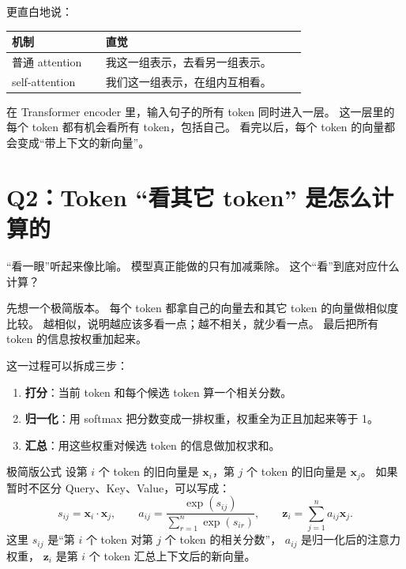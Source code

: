 \documentclass[11pt,a4paper]{ctexart}
\newcommand{\vect}[1]{\boldsymbol{#1}}
\begin{document}
更直白地说：

\begin{center}
\begin{tabular}{>{\raggedright\arraybackslash}p{0.28\linewidth} >{\raggedright\arraybackslash}p{0.60\linewidth}}
\toprule
机制 & 直觉 \\
\midrule
普通 attention & 我这一组表示，去看另一组表示。\\
self-attention & 我们这一组表示，在组内互相看。\\
\bottomrule
\end{tabular}
\end{center}

在 Transformer encoder 里，输入句子的所有 token 同时进入一层。
这一层里的每个 token 都有机会看所有 token，包括自己。
看完以后，每个 token 的向量都会变成“带上下文的新向量”。

\section{Q2：Token “看其它 token” 是怎么计算的}

\begin{questionblock}
“看一眼”听起来像比喻。
模型真正能做的只有加减乘除。
这个“看”到底对应什么计算？
\end{questionblock}

\begin{intuitionblock}
先想一个极简版本。
每个 token 都拿自己的向量去和其它 token 的向量做相似度比较。
越相似，说明越应该多看一点；越不相关，就少看一点。
最后把所有 token 的信息按权重加起来。
\end{intuitionblock}

这一过程可以拆成三步：

\begin{enumerate}[label=\textbf{\arabic*.}]
  \item \textbf{打分}：当前 token 和每个候选 token 算一个相关分数。
  \item \textbf{归一化}：用 softmax 把分数变成一排权重，权重全为正且加起来等于 1。
  \item \textbf{汇总}：用这些权重对候选 token 的信息做加权求和。
\end{enumerate}

\begin{mathblock}{极简版公式}
设第 \(i\) 个 token 的旧向量是 \(\vect{x}_i\)，第 \(j\) 个 token 的旧向量是 \(\vect{x}_j\)。
如果暂时不区分 Query、Key、Value，可以写成：
\[
  s_{ij} = \vect{x}_i \cdot \vect{x}_j,
  \qquad
  a_{ij} = \frac{\exp(s_{ij})}{\sum_{r=1}^{n}\exp(s_{ir})},
  \qquad
  \vect{z}_i = \sum_{j=1}^{n} a_{ij}\vect{x}_j.
\]
这里 \(s_{ij}\) 是“第 \(i\) 个 token 对第 \(j\) 个 token 的相关分数”，
\(a_{ij}\) 是归一化后的注意力权重，
\(\vect{z}_i\) 是第 \(i\) 个 token 汇总上下文后的新向量。
\end{mathblock}
\end{document}
